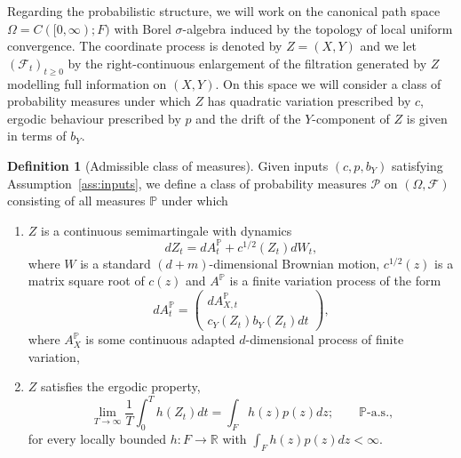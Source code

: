 \documentclass{article}
\theoremstyle{plain}
\theoremstyle{definition}
\newtheorem{defn}[lem]{Definition}
\newcommand{\R}{\mathbb{R}}
\renewcommand{\P}{\mathbb{P}}
\newcommand{\F}{\mathcal{F}}
\newcommand{\Fcal}{{\mathcal F}}
\newcommand{\Pcal}{{\mathcal P}}
\numberwithin{lem}{section}
\begin{document}

Regarding the probabilistic structure, we will work on the canonical path space $\Omega = C([0,\infty);F)$ with Borel $\sigma$-algebra induced by the topology of local uniform convergence. The coordinate process is denoted by $Z = (X,Y)$ and we let $(\Fcal_t)_{t \geq 0}$ by the right-continuous enlargement of the filtration generated by $Z$ modelling full information on $(X,Y)$. On this space we will consider a class of probability measures under which $Z$ has quadratic variation prescribed by $c$, ergodic behaviour prescribed by $p$ and the drift of the $Y$-component of $Z$ is given in terms of $b_Y$.
\begin{defn}[Admissible class of measures] \label{defn:class} Given inputs $(c,p,b_Y)$ satisfying Assumption~\ref{ass:inputs}, we define a class of probability measures $\Pcal$ on $(\Omega,\F)$ consisting of all measures $\P$ under which
\begin{enumerate}
    \item \label{item:dynamics} $Z$ is a continuous semimartingale with dynamics 
    \begin{equation} \label{eqn:Z_dynamics} 
    dZ_t  = dA_t^\P + c^{1/2}(Z_t)dW_t,
    \end{equation}
    where $W$ is a standard $(d+m)$-dimensional Brownian motion, $c^{1/2}(z)$ is a matrix square root of $c(z)$ and $A^\P$ is a finite variation process of the form
    \begin{equation} \label{eqn:dA}
        dA_t^\P = \begin{pmatrix} dA^\P_{X,t} \\ c_Y(Z_t)b_Y(Z_t)dt \end{pmatrix},
    \end{equation}
    where $A^\P_X$ is some continuous adapted $d$-dimensional process of finite variation,
    \item $Z$ satisfies the ergodic property,
    \begin{equation} \label{eqn:ergodic}
    \lim_{T \to \infty} \frac{1}{T}\int_0^T h(Z_t)dt = \int_F h(z)p(z)dz; \qquad \P\text{-a.s.,}
    \end{equation}
    for every locally bounded $h:F \to \R$ with $\int_F h(z)p(z)dz < \infty$. \label{item:ergodic}
\end{enumerate}
\end{defn}
\end{document}
